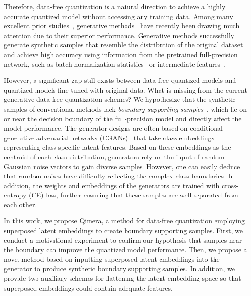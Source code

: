 \documentclass{article}
\newcommand{\aname}{Qimera\xspace}
\newcommand{\JL}[1]{{\color{magenta}[\textbf{\sc JLee}: \textit{#1}]}}
\renewcommand{\JL}[1]{}
\begin{document}
Therefore, data-free quantization is a natural direction to achieve a highly accurate quantized model without accessing any training data.
Among many excellent prior studies~\cite{aciq, dfq, choi2020data, outlier}, generative methods~\cite{gdfq, zaq, zeroq} have recently been drawing much attention due to their superior performance.
Generative methods successfully generate synthetic samples that resemble the distribution of the original dataset and achieve high accuracy using information from the pretrained full-precision network, such as batch-normalization statistics~\cite{zeroq, gdfq} or intermediate features~\cite{zaq}.



However, a significant gap still exists between data-free quantized models and quantized models fine-tuned with original data.
What is missing from the current generative data-free quantization schemes?
We hypothesize that the synthetic samples of conventional methods lack \emph{boundary supporting samples}~\cite{heo2019knowledge}, which lie on or near the decision boundary of the full-precision model and directly affect the model performance.
The generator designs are often based on conditional generative adversarial networks (CGANs)~\cite{cgan, acgan} that take class embeddings representing class-specific latent features. 
Based on these embeddings as the centroid of each class distribution, generators rely on the input of random Gaussian noise vectors to gain diverse samples. 
However, one can easily deduce that random noises have difficulty reflecting the complex class boundaries.
In addition, the weights and embeddings of the generators are trained with cross-entropy (CE) loss, further ensuring that these samples are well-separated from each other.



\JL{flat --> align , or cite stylegan here}

In this work, we propose \aname, a method for data-free quantization employing superposed latent embeddings to create boundary supporting samples.
First, we conduct a motivational experiment to confirm our hypothesis that samples near the boundary can improve the quantized model performance. 
Then, we propose a novel method based on inputting superposed latent embeddings into the generator to produce synthetic boundary supporting samples. 
In addition, we provide two auxiliary schemes for flattening the latent embedding space so that superposed embeddings could contain adequate features. 
\end{document}
